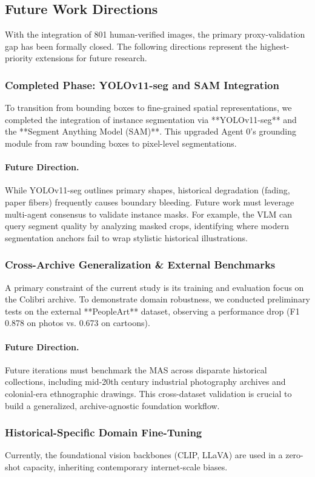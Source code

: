 \documentclass[12pt,onecolumn,a4paper]{IEEEtran}
\begin{document}
\subsection{Future Work Directions}
With the integration of 801 human-verified images, the primary proxy-validation gap has been formally closed. The following directions represent the highest-priority extensions for future research.

\subsubsection{Completed Phase: YOLOv11-seg and SAM Integration}
To transition from bounding boxes to fine-grained spatial representations, we completed the integration of instance segmentation via **YOLOv11-seg** and the **Segment Anything Model (SAM)**. This upgraded Agent 0's grounding module from raw bounding boxes to pixel-level segmentations. 
\paragraph{Future Direction.} While YOLOv11-seg outlines primary shapes, historical degradation (fading, paper fibers) frequently causes boundary bleeding. Future work must leverage multi-agent consensus to validate instance masks. For example, the VLM can query segment quality by analyzing masked crops, identifying where modern segmentation anchors fail to wrap stylistic historical illustrations.

\subsubsection{Cross-Archive Generalization \& External Benchmarks}
A primary constraint of the current study is its training and evaluation focus on the Colibri archive. To demonstrate domain robustness, we conducted preliminary tests on the external **PeopleArt** dataset, observing a performance drop (F1 0.878 on photos vs. 0.673 on cartoons).
\paragraph{Future Direction.} Future iterations must benchmark the MAS across disparate historical collections, including mid-20th century industrial photography archives and colonial-era ethnographic drawings. This cross-dataset validation is crucial to build a generalized, archive-agnostic foundation workflow.

\subsubsection{Historical-Specific Domain Fine-Tuning}
Currently, the foundational vision backbones (CLIP, LLaVA) are used in a zero-shot capacity, inheriting contemporary internet-scale biases.
\end{document}
